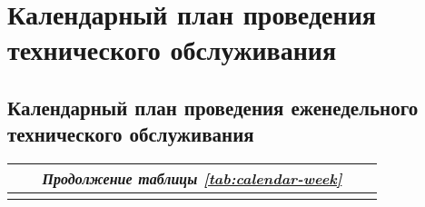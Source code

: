 \documentclass[a4paper,14pt]{extarticle}
\begin{document}
\newpage
\section{Календарный план проведения технического обслуживания}
\subsection*{Календарный план проведения еженедельного технического обслуживания}


	\begin{longtable}{|p{0.35\linewidth}|p{0.1\linewidth}|p{0.1\linewidth}|p{0.13\linewidth}|p{0.17\linewidth}|}
	
	
	\endfirsthead
	
	\multicolumn{5}{c}{\textit{Продолжение таблицы \ref{tab:calendar-week}}}\\
	\endhead
	
	\endfoot
	

\end{longtable}
\end{document}
